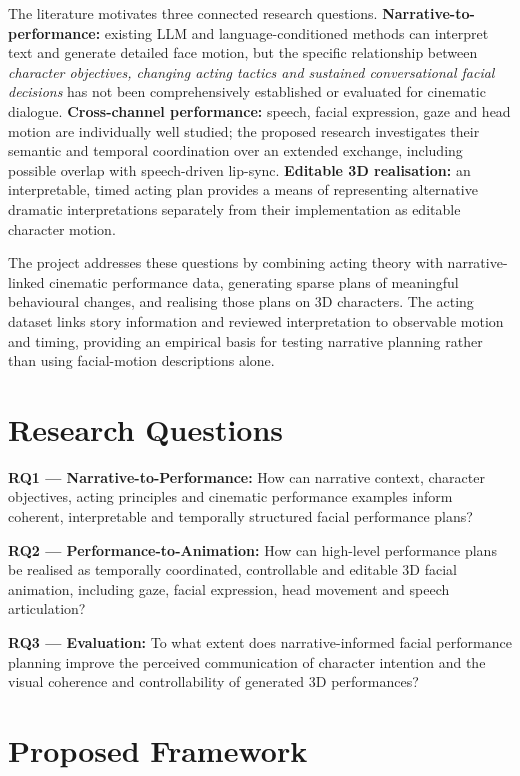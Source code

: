 \documentclass[11pt,a4paper]{article}
\begin{document}
The literature motivates three connected research questions. \textbf{Narrative-to-performance:} existing LLM and language-conditioned methods can interpret text and generate detailed face motion, but the specific relationship between \emph{character objectives, changing acting tactics and sustained conversational facial decisions} has not been comprehensively established or evaluated for cinematic dialogue. \textbf{Cross-channel performance:} speech, facial expression, gaze and head motion are individually well studied; the proposed research investigates their semantic and temporal coordination over an extended exchange, including possible overlap with speech-driven lip-sync. \textbf{Editable 3D realisation:} an interpretable, timed acting plan provides a means of representing alternative dramatic interpretations separately from their implementation as editable character motion.

The project addresses these questions by combining acting theory with narrative-linked cinematic performance data, generating sparse plans of meaningful behavioural changes, and realising those plans on 3D characters. The acting dataset links story information and reviewed interpretation to observable motion and timing, providing an empirical basis for testing narrative planning rather than using facial-motion descriptions alone.

\section{Research Questions}

\noindent\textbf{RQ1 --- Narrative-to-Performance:} How can narrative context, character objectives, acting principles and cinematic performance examples inform coherent, interpretable and temporally structured facial performance plans?

\medskip
\noindent\textbf{RQ2 --- Performance-to-Animation:} How can high-level performance plans be realised as temporally coordinated, controllable and editable 3D facial animation, including gaze, facial expression, head movement and speech articulation?

\medskip
\noindent\textbf{RQ3 --- Evaluation:} To what extent does narrative-informed facial performance planning improve the perceived communication of character intention and the visual coherence and controllability of generated 3D performances?

\section{Proposed Framework}
\end{document}
